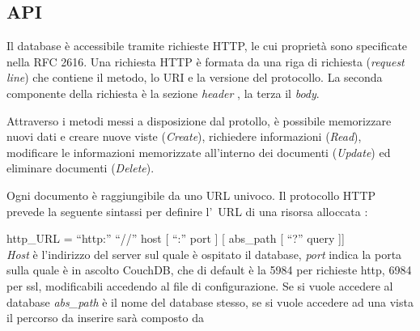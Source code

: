 \newpage
\subsection{API}
Il database è accessibile tramite richieste \acf{HTTP}, le cui proprietà sono
specificate nella \ac{RFC} 2616. Una richiesta
\ac{HTTP} è formata da una riga di richiesta (\emph{request line}) che contiene
il metodo, lo \ac{URI} e la versione del protocollo. La seconda componente della
richiesta è la sezione \emph{header} , la terza il \emph{body}. 

Attraverso i metodi messi a disposizione dal protollo,
è possibile memorizzare nuovi dati e creare nuove viste (\emph{Create}),
richiedere informazioni (\emph{Read}), modificare le informazioni memorizzate
all'interno dei documenti (\emph{Update}) ed eliminare documenti
(\emph{Delete}).

Ogni documento è raggiungibile da uno \ac{URL} univoco. Il protocollo \ac{HTTP}
prevede la seguente sintassi per definire l'~\ac{URL} di una risorsa alloccata : 

http\_URL = ``http:'' ``//'' host [ ``:'' port ] [ abs\_path [ ``?'' query
]]
\\
\emph{Host} è l'indirizzo del server sul quale è ospitato il database,
\emph{port} indica la porta sulla quale è in ascolto CouchDB, che di default è
la 5984 per richieste http, 6984 per ssl, modificabili accedendo al file di
configurazione. Se si vuole accedere al database \emph{abs\_path} è il nome del
database stesso, se si vuole accedere ad una vista il percorso da inserire sarà
composto da

